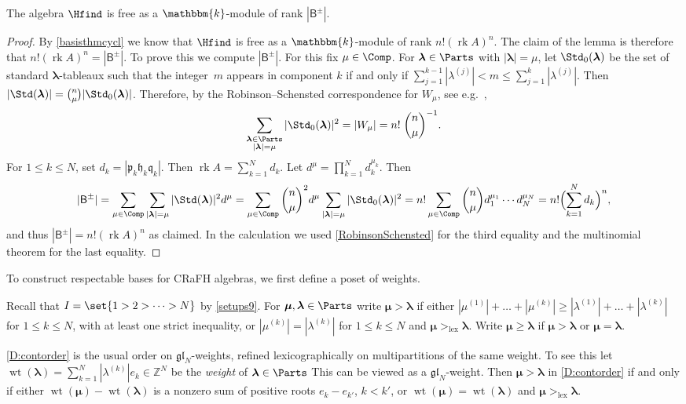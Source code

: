\documentclass[a4paper,11pt]{amsart}
\newcommand\blam{{\boldsymbol\lambda}}
\newcommand\bmu{{\boldsymbol\mu}}
\numberwithin{equation}{subsection}
\theoremstyle{definition}
\theoremstyle{theorem}
\theoremstyle{remark}
\newcommand\plam[1][\lambda]{\mathfrak{p}_{#1}}
\newcommand\hlam[1][\lambda]{\mathfrak{h}_{#1}}
\newcommand\qlam[1][\lambda]{\mathfrak{q}_{#1}}
\newcommand\Sym{W}
\newcommand\Basis[1][\pm]{\mathsf{B}^{#1}}
\newcommand\op{\operatorname}
\newcommand\kk{\mathbbm{k}}
\newcommand\Z{\mathbb{Z}}
\begin{document}
\begin{Lemma}\label{L:rank}
  The algebra $\Hfind$ is free as a $\kk$-module of rank $|\Basis|$.
\end{Lemma}
\begin{proof}
By \autoref{basisthmcycl} we know that $\Hfind$ is free as a $\kk$-module of rank $n!(\op{rk} A)^n$. The claim of the lemma is therefore that  $n!(\op{rk} A)^n=|\Basis|$. To prove this we compute $|\Basis|$.
  For this fix $\mu\in\Comp$. For $\blam\in\Parts$ with $|\blam|=\mu$,  let $\Std_0(\blam)$ be the
  set of standard $\blam$-tableaux such that the integer~$m$ appears in component $k$ if
  and only if $\sum_{j=1}^{k-1}|\lambda^{(j)}|<m\le\sum_{j=1}^k|\lambda^{(j)}|$.
  Then $|\Std(\blam)|=\binom n\mu |\Std_0(\blam)|$. Therefore, by the Robinson--Schensted
  correspondence for $\Sym_\mu$, see e.g.\ \cite[\S4]{Fulton:Tableaux},
  \begin{equation}\label{RobinsonSchensted}
    \sum_{\substack{\blam\in\Parts\\|\blam|=\mu}}|\Std_0(\blam)|^2
      =|\Sym_\mu| = n!\;\binom n\mu^{-1}.
  \end{equation}
  For $1\le k\le N$, set $d_k=|\plam[k]\hlam[k]\qlam[k]|$. Then
  $\op{rk} A=\sum_{k=1}^Nd_k$. Let $d^\mu=\prod_{k=1}^Nd_k^{\mu_k}$.  Then
  \[
    |\Basis| = \sum_{\mu\in\Comp}\sum_{|\blam|=\mu}|\Std(\blam)|^2d^\mu
        = \sum_{\mu\in\Comp}\binom{n}{\mu}^2 d^\mu\sum_{|\blam|=\mu}|\Std_0(\blam)|^2
        = n!\sum_{\mu\in\Comp}\binom n\mu d_1^{\mu_1}\cdots d_N^{\mu_N}
        = n!\Bigl(\sum_{k=1}^Nd_k\Bigr)^n,
  \]
 and thus $|\Basis|=n!(\op{rk} A)^n$ as claimed.  In the calculation we used \autoref{RobinsonSchensted} for  the third equality and the multinomial theorem for the last equality.
\end{proof}
   To construct respectable bases for CRaFH algebras, we first  define a poset of weights.

 \begin{Definition}\label{D:contorder}
  Recall that $I=\set{1>2>\dots>N}$ by \autoref{setups9}. For
  $\bmu,\blam\in\Parts$ write $\bmu>\blam$ if either
  $|\mu^{(1)}|+\dots+|\mu^{(k)}|\ge|\lambda^{(1)}|+\dots+|\lambda^{(k)}|$ for $1\le k\le N$, with at
  least one strict inequality, or $|\mu^{(k)}|=|\lambda^{(k)}|$ for $1\le k\le N$ and
  $\bmu>_{\mathrm{lex}}\blam$. Write $\bmu\ge\blam$ if $\bmu>\blam$ or $\bmu=\blam$.
\end{Definition}

\begin{Remark}\label{R:glweights}
 \autoref{D:contorder} is the usual order on $\mathfrak{gl}_N$-weights, refined lexicographically on multipartitions of the same weight. To see this let  $\operatorname{wt}(\blam)=\sum_{k=1}^N|\lambda^{(k)}|e_k\in\Z^N$ be the \emph{weight} of $\blam\in\Parts$ This can be  viewed as a $\mathfrak{gl}_N$-weight. Then $\bmu>\blam$ in \autoref{D:contorder} if and only if either $\operatorname{wt}(\bmu)-\operatorname{wt}(\blam)$ is a nonzero sum of positive roots $e_k-e_{k'}$, $k<k'$, or $\operatorname{wt}(\bmu)=\operatorname{wt}(\blam)$ and $\bmu>_{\mathrm{lex}}\blam$. \end{Remark}
\end{document}
